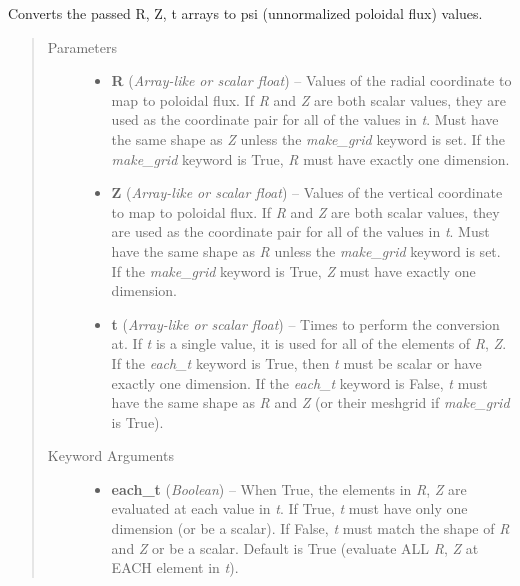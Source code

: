 \documentclass[letterpaper,10pt,english]{sphinxmanual}
\begin{document}
\begin{fulllineitems}
\begin{fulllineitems}
\label{eqtools:eqtools.core.Equilibrium.rz2psi}
Converts the passed R, Z, t arrays to psi (unnormalized poloidal flux) values.
\begin{quote}\begin{description}
\item[{Parameters}] \leavevmode\begin{itemize}
\item {} 
\textbf{R} (\emph{Array-like or scalar float}) --
Values of the radial coordinate to
map to poloidal flux. If \emph{R} and \emph{Z} are both scalar values,
they are used as the coordinate pair for all of the values in
\emph{t}. Must have the same shape as \emph{Z} unless the \emph{make\_grid}
keyword is set. If the \emph{make\_grid} keyword is True, \emph{R} must
have exactly one dimension.

\item {} 
\textbf{Z} (\emph{Array-like or scalar float}) --
Values of the vertical coordinate to
map to poloidal flux. If \emph{R} and \emph{Z} are both scalar values,
they are used as the coordinate pair for all of the values in
\emph{t}. Must have the same shape as \emph{R} unless the \emph{make\_grid}
keyword is set. If the \emph{make\_grid} keyword is True, \emph{Z} must
have exactly one dimension.

\item {} 
\textbf{t} (\emph{Array-like or scalar float}) --
Times to perform the conversion at.
If \emph{t} is a single value, it is used for all of the elements of
\emph{R}, \emph{Z}. If the \emph{each\_t} keyword is True, then \emph{t} must be
scalar or have exactly one dimension. If the \emph{each\_t} keyword is
False, \emph{t} must have the same shape as \emph{R} and \emph{Z} (or their
meshgrid if \emph{make\_grid} is True).

\end{itemize}

\item[{Keyword Arguments}] \leavevmode\begin{itemize}
\item {} 
\textbf{each\_t} (\emph{Boolean}) --
When True, the elements in \emph{R}, \emph{Z} are evaluated
at each value in \emph{t}. If True, \emph{t} must have only one dimension
(or be a scalar). If False, \emph{t} must match the shape of \emph{R} and
\emph{Z} or be a scalar. Default is True (evaluate ALL \emph{R}, \emph{Z} at
EACH element in \emph{t}).


\end{itemize}
\end{description}
\end{quote}
\end{fulllineitems}
\end{fulllineitems}
\end{document}
